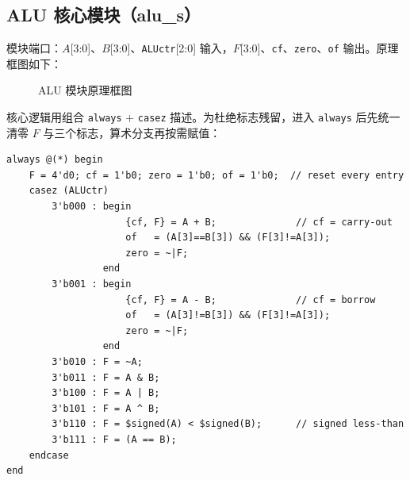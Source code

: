 \documentclass[12pt, a4paper]{ctexart}
\begin{document}
\subsection{ALU 核心模块（alu\_s）}
模块端口：$A$[3:0]、$B$[3:0]、\texttt{ALUctr}[2:0] 输入，$F$[3:0]、\texttt{cf}、\texttt{zero}、\texttt{of} 输出。原理框图如下：

\begin{figure}[htbp]
    \centering
    \caption{ALU 模块原理框图}
\end{figure}

核心逻辑用组合 \texttt{always} + \texttt{casez} 描述。为杜绝标志残留，进入 \texttt{always} 后先统一清零 $F$ 与三个标志，算术分支再按需赋值：

\begin{lstlisting}
always @(*) begin
    F = 4'd0; cf = 1'b0; zero = 1'b0; of = 1'b0;  // reset every entry
    casez (ALUctr)
        3'b000 : begin
                     {cf, F} = A + B;              // cf = carry-out
                     of   = (A[3]==B[3]) && (F[3]!=A[3]);
                     zero = ~|F;
                 end
        3'b001 : begin
                     {cf, F} = A - B;              // cf = borrow
                     of   = (A[3]!=B[3]) && (F[3]!=A[3]);
                     zero = ~|F;
                 end
        3'b010 : F = ~A;
        3'b011 : F = A & B;
        3'b100 : F = A | B;
        3'b101 : F = A ^ B;
        3'b110 : F = $signed(A) < $signed(B);      // signed less-than
        3'b111 : F = (A == B);
    endcase
end
\end{lstlisting}
\end{document}
